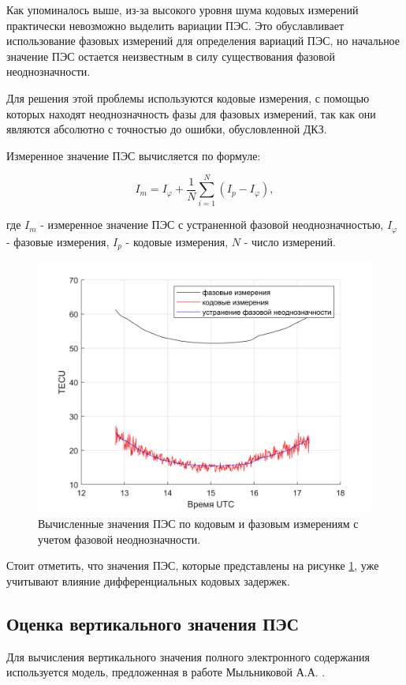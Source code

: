 \documentclass[a4paper]{article}
\begin{document}
Как упоминалось выше, из-за высокого уровня шума кодовых измерений практически невозможно выделить вариации ПЭС. Это обуславливает использование фазовых измерений для определения вариаций ПЭС, но начальное значение ПЭС остается неизвестным в силу существования фазовой неоднозначности.

Для решения этой проблемы используются кодовые измерения, с помощью которых находят неоднозначность фазы для фазовых измерений, так как они являются абсолютно с точностью до ошибки, обусловленной ДКЗ.

Измеренное значение ПЭС вычисляется по формуле:

\begin{equation}
I_{m} = I_{\varphi} + \frac{1}{N}\sum_{i=1}^N (I_p - I_{\varphi}),
\end{equation}

где $I_m$ - измеренное значение ПЭС с устраненной фазовой неоднозначностью, $I_\varphi$ - фазовые измерения, $I_p$ - кодовые измерения, $N$ - число измерений.  

\begin{figure}[h!]
\centering
\includegraphics[width = 1\linewidth]{pics/clean_pics/stec.png}
\caption{Вычисленные значения ПЭС по кодовым и фазовым измерениям с учетом фазовой неоднозначности.}
\label{stecplot}
\end{figure}

Стоит отметить, что значения ПЭС, которые представлены на рисунке \ref{stecplot}, уже учитывают влияние дифференциальных кодовых задержек.

\newpage
\subsection{Оценка вертикального значения ПЭС}
Для вычисления вертикального значения полного электронного содержания используется модель, предложенная в работе Мыльниковой А.А. \cite{milnikova}.
\end{document}
